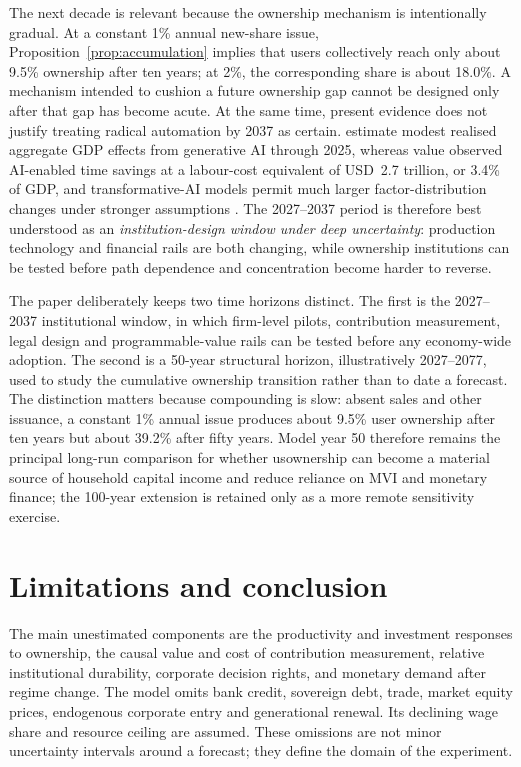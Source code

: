The next decade is relevant because the ownership mechanism is intentionally gradual. At a constant 1\% annual new-share issue, Proposition~\ref{prop:accumulation} implies that users collectively reach only about 9.5\% ownership after ten years; at 2\%, the corresponding share is about 18.0\%. A mechanism intended to cushion a future ownership gap cannot be designed only after that gap has become acute. At the same time, present evidence does not justify treating radical automation by 2037 as certain. \citet{katz2026} estimate modest realised aggregate GDP effects from generative AI through 2025, whereas \citet{fannguyen2026} value observed AI-enabled time savings at a labour-cost equivalent of USD~2.7 trillion, or 3.4\% of GDP, and transformative-AI models permit much larger factor-distribution changes under stronger assumptions \citep{trammell2026}. The 2027--2037 period is therefore best understood as an \emph{institution-design window under deep uncertainty}: production technology and financial rails are both changing, while ownership institutions can be tested before path dependence and concentration become harder to reverse.

\begin{table}[htbp]\centering\small
\caption{Illustrative evidence-gated path for the next decade; dates are design horizons, not forecasts}

\end{table}

The paper deliberately keeps two time horizons distinct. The first is the 2027--2037 institutional window, in which firm-level pilots, contribution measurement, legal design and programmable-value rails can be tested before any economy-wide adoption. The second is a 50-year structural horizon, illustratively 2027--2077, used to study the cumulative ownership transition rather than to date a forecast. The distinction matters because compounding is slow: absent sales and other issuance, a constant 1\% annual issue produces about 9.5\% user ownership after ten years but about 39.2\% after fifty years. Model year 50 therefore remains the principal long-run comparison for whether usownership can become a material source of household capital income and reduce reliance on MVI and monetary finance; the 100-year extension is retained only as a more remote sensitivity exercise.

\section{Limitations and conclusion}
The main unestimated components are the productivity and investment responses to ownership, the causal value and cost of contribution measurement, relative institutional durability, corporate decision rights, and monetary demand after regime change. The model omits bank credit, sovereign debt, trade, market equity prices, endogenous corporate entry and generational renewal. Its declining wage share and resource ceiling are assumed. These omissions are not minor uncertainty intervals around a forecast; they define the domain of the experiment.

